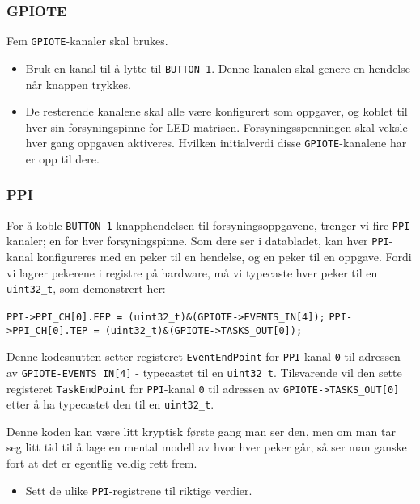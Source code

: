 \subsubsection{GPIOTE}

Fem \verb|GPIOTE|-kanaler skal brukes. 

\begin{itemize}
    \item Bruk en kanal til å lytte til \verb|BUTTON 1|. Denne kanalen skal genere en hendelse når knappen trykkes. 
    \item De resterende kanalene skal alle være konfigurert som oppgaver, og koblet til hver sin forsyningspinne for LED-matrisen. Forsyningsspenningen skal veksle hver gang oppgaven aktiveres. Hvilken initialverdi disse \verb|GPIOTE|-kanalene har er opp til dere.
\end{itemize}

\subsubsection{PPI}

For å koble \verb|BUTTON 1|-knapphendelsen til forsyningsoppgavene, trenger vi fire \verb|PPI|-kanaler; en for hver forsyningspinne. Som dere ser i databladet, kan hver \verb|PPI|-kanal konfigureres med en peker til en hendelse, og en peker til en oppgave. Fordi vi lagrer pekerene i registre på hardware, må vi typecaste hver peker til en \texttt{uint32\_t}, som demonstrert her:

\verb|PPI->PPI_CH[0].EEP = (uint32_t)&(GPIOTE->EVENTS_IN[4]);|\newline
\verb|PPI->PPI_CH[0].TEP = (uint32_t)&(GPIOTE->TASKS_OUT[0]);|


Denne kodesnutten setter registeret \verb|EventEndPoint| for \verb|PPI|-kanal \verb|0| til adressen av \verb|GPIOTE-EVENTS_IN[4]| - typecastet til en \verb|uint32_t|. Tilsvarende vil den sette registeret \verb|TaskEndPoint| for \verb|PPI|-kanal \verb|0| til adressen av \verb|GPIOTE->TASKS_OUT[0]| etter å ha typecastet den til en \verb|uint32_t|.


Denne koden kan være litt kryptisk første gang man ser den, men om man tar seg litt tid til å lage en mental modell av hvor hver peker går, så ser man ganske fort at det er egentlig veldig rett frem. 

\begin{itemize}
    \item Sett de ulike \verb|PPI|-registrene til riktige verdier.
\end{itemize}



